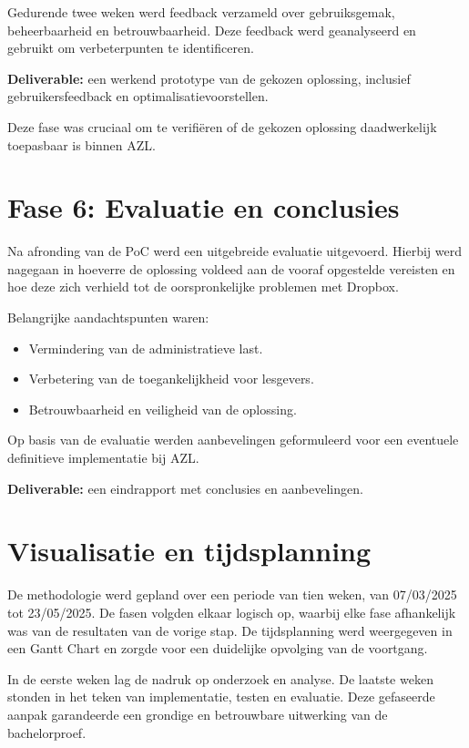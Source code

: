 Gedurende twee weken werd feedback verzameld over gebruiksgemak, beheerbaarheid en betrouwbaarheid. 
Deze feedback werd geanalyseerd en gebruikt om verbeterpunten te identificeren.

\textbf{Deliverable:} een werkend prototype van de gekozen oplossing, inclusief gebruikersfeedback en optimalisatievoorstellen.

Deze fase was cruciaal om te verifiëren of de gekozen oplossing daadwerkelijk toepasbaar is binnen AZL.

\section{Fase 6: Evaluatie en conclusies}
Na afronding van de PoC werd een uitgebreide evaluatie uitgevoerd. Hierbij werd nagegaan in hoeverre de oplossing 
voldeed aan de vooraf opgestelde vereisten en hoe deze zich verhield tot de oorspronkelijke problemen met Dropbox.

Belangrijke aandachtspunten waren:
\begin{itemize}
    \item Vermindering van de administratieve last.
    \item Verbetering van de toegankelijkheid voor lesgevers.
    \item Betrouwbaarheid en veiligheid van de oplossing.
\end{itemize}

Op basis van de evaluatie werden aanbevelingen geformuleerd voor een eventuele definitieve implementatie bij AZL.

\textbf{Deliverable:} een eindrapport met conclusies en aanbevelingen.

\section{Visualisatie en tijdsplanning}
De methodologie werd gepland over een periode van tien weken, van 07/03/2025 tot 23/05/2025. 
De fasen volgden elkaar logisch op, waarbij elke fase afhankelijk was van de resultaten van de vorige stap. 
De tijdsplanning werd weergegeven in een Gantt Chart en zorgde voor een duidelijke opvolging van de voortgang.

In de eerste weken lag de nadruk op onderzoek en analyse. De laatste weken stonden in het teken van implementatie, testen en evaluatie. 
Deze gefaseerde aanpak garandeerde een grondige en betrouwbare uitwerking van de bachelorproef.